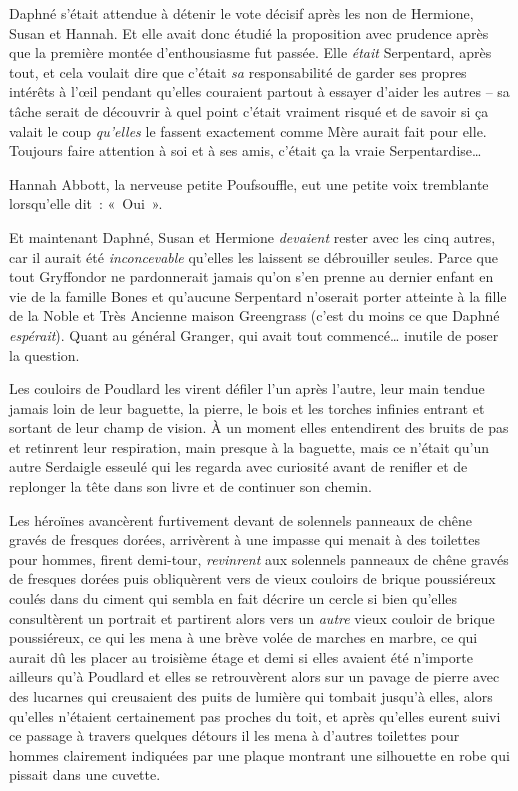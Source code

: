 Daphné s'était attendue à détenir le vote décisif après les non de Hermione, Susan et Hannah.
Et elle avait donc étudié la proposition avec prudence après que la première montée d'enthousiasme fut passée.
Elle \emph{était} Serpentard, après tout, et cela voulait dire que c'était \emph{sa} responsabilité de garder ses propres intérêts à l'œil pendant qu'elles couraient partout à essayer d'aider les autres -- sa tâche serait de découvrir à quel point c'était vraiment risqué et de savoir si ça valait le coup \emph{qu'elles} le fassent exactement comme Mère aurait fait pour elle.
Toujours faire attention à soi et à ses amis, c'était ça la vraie Serpentardise…

Hannah Abbott, la nerveuse petite Poufsouffle, eut une petite voix tremblante lorsqu'elle dit~: «~Oui~».

Et maintenant Daphné, Susan et Hermione \emph{devaient} rester avec les cinq autres, car il aurait été \emph{inconcevable} qu'elles les laissent se débrouiller seules.
Parce que tout Gryffondor ne pardonnerait jamais qu'on s'en prenne au dernier enfant en vie de la famille Bones et qu'aucune Serpentard n'oserait porter atteinte à la fille de la Noble et Très Ancienne maison Greengrass (c'est du moins ce que Daphné \emph{espérait}).
Quant au général Granger, qui avait tout commencé… inutile de poser la question.

Les couloirs de Poudlard les virent défiler l'un après l'autre, leur main tendue jamais loin de leur baguette, la pierre, le bois et les torches infinies entrant et sortant de leur champ de vision.
À un moment elles entendirent des bruits de pas et retinrent leur respiration, main presque à la baguette, mais ce n'était qu'un autre Serdaigle esseulé qui les regarda avec curiosité avant de renifler et de replonger la tête dans son livre et de continuer son chemin.

Les héroïnes avancèrent furtivement devant de solennels panneaux de chêne gravés de fresques dorées, arrivèrent à une impasse qui menait à des toilettes pour hommes, firent demi-tour, \emph{revinrent} aux solennels panneaux de chêne gravés de fresques dorées puis obliquèrent vers de vieux couloirs de brique poussiéreux coulés dans du ciment qui sembla en fait décrire un cercle si bien qu'elles consultèrent un portrait et partirent alors vers un \emph{autre} vieux couloir de brique poussiéreux, ce qui les mena à une brève volée de marches en marbre, ce qui aurait dû les placer au troisième étage et demi si elles avaient été n'importe ailleurs qu'à Poudlard et elles se retrouvèrent alors sur un pavage de pierre avec des lucarnes qui creusaient des puits de lumière qui tombait jusqu'à elles, alors qu'elles n'étaient certainement pas proches du toit, et après qu'elles eurent suivi ce passage à travers quelques détours il les mena à d'autres toilettes pour hommes clairement indiquées par une plaque montrant une silhouette en robe qui pissait dans une cuvette.

